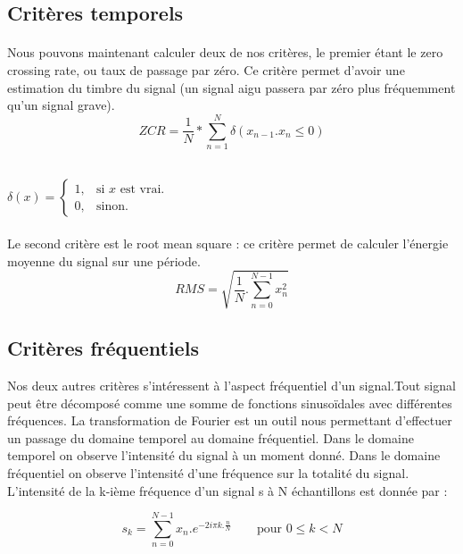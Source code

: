 \documentclass[soumission]{ir}
\begin{document}
\subsection{Critères temporels}
\paragraph{}
Nous pouvons maintenant calculer deux de nos critères, le premier étant le zero crossing rate, ou taux de 
passage par zéro. Ce critère permet d’avoir une estimation du timbre du signal (un signal aigu passera par 
zéro plus fréquemment qu’un signal grave).
\begin{equation}
    ZCR = \frac{1}{N}*\sum_{n = 1}^{N} \delta( x_{n-1}.x_n \leqslant 0 )
\end{equation}

\\

$\delta(x)=\begin{cases}
    1, & \text{si $x$ est vrai}.\\
    0, & \text{sinon}.
\end{cases}$

\paragraph{}
Le second critère est le root mean square : ce critère permet de calculer l'énergie moyenne du signal sur 
une période.
\begin{equation}
    RMS = \sqrt{\frac{1}{N}.\sum_{n = 0}^{N-1} x_n^2}
\end{equation}

\subsection{Critères fréquentiels}
Nos deux autres critères s’intéressent à l’aspect fréquentiel d’un signal.Tout signal peut être décomposé 
comme une somme de fonctions sinusoïdales avec différentes fréquences. La transformation de Fourier est un 
outil nous permettant d’effectuer un passage du domaine temporel au domaine fréquentiel. Dans le domaine 
temporel on observe l’intensité du signal à un moment donné. Dans le domaine fréquentiel on observe 
l’intensité d’une fréquence sur la totalité du signal. L’intensité de la  k-ième fréquence d’un signal s à N 
échantillons est donnée par :

\begin{equation}
    s_k = \sum_{n = 0}^{N-1} x_n.e^{-2 i \pi k. \frac{n}{N}}
    \qquad\text{pour $0 \leqslant k < N$}
\end{equation}
\end{document}
